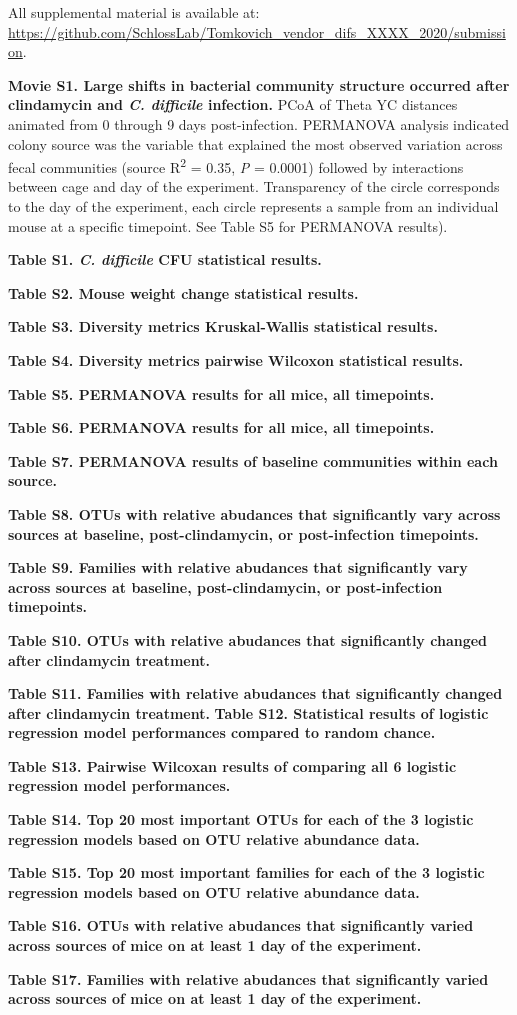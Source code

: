 \documentclass[11pt,]{article}
\begin{document}
All supplemental material is available at:
\url{https://github.com/SchlossLab/Tomkovich_vendor_difs_XXXX_2020/submission}.

\textbf{Movie S1. Large shifts in bacterial community structure occurred
after clindamycin and \emph{C. difficile} infection.} PCoA of Theta YC
distances animated from 0 through 9 days post-infection. PERMANOVA
analysis indicated colony source was the variable that explained the
most observed variation across fecal communities (source
R\textsuperscript{2} = 0.35, \emph{P} = 0.0001) followed by interactions
between cage and day of the experiment. Transparency of the circle
corresponds to the day of the experiment, each circle represents a
sample from an individual mouse at a specific timepoint. See Table S5
for PERMANOVA results).

\textbf{Table S1. \emph{C. difficile} CFU statistical results.}

\textbf{Table S2. Mouse weight change statistical results.}

\textbf{Table S3. Diversity metrics Kruskal-Wallis statistical results.}

\textbf{Table S4. Diversity metrics pairwise Wilcoxon statistical
results.}

\textbf{Table S5. PERMANOVA results for all mice, all timepoints.}

\textbf{Table S6. PERMANOVA results for all mice, all timepoints.}

\textbf{Table S7. PERMANOVA results of baseline communities within each
source.}

\textbf{Table S8. OTUs with relative abudances that significantly vary
across sources at baseline, post-clindamycin, or post-infection
timepoints.}

\textbf{Table S9. Families with relative abudances that significantly
vary across sources at baseline, post-clindamycin, or post-infection
timepoints.}

\textbf{Table S10. OTUs with relative abudances that significantly
changed after clindamycin treatment.}

\textbf{Table S11. Families with relative abudances that significantly
changed after clindamycin treatment.} \textbf{Table S12. Statistical
results of logistic regression model performances compared to random
chance.}

\textbf{Table S13. Pairwise Wilcoxan results of comparing all 6 logistic
regression model performances.}

\textbf{Table S14. Top 20 most important OTUs for each of the 3 logistic
regression models based on OTU relative abundance data.}

\textbf{Table S15. Top 20 most important families for each of the 3
logistic regression models based on OTU relative abundance data.}

\textbf{Table S16. OTUs with relative abudances that significantly
varied across sources of mice on at least 1 day of the experiment.}

\textbf{Table S17. Families with relative abudances that significantly
varied across sources of mice on at least 1 day of the experiment.}
\end{document}
